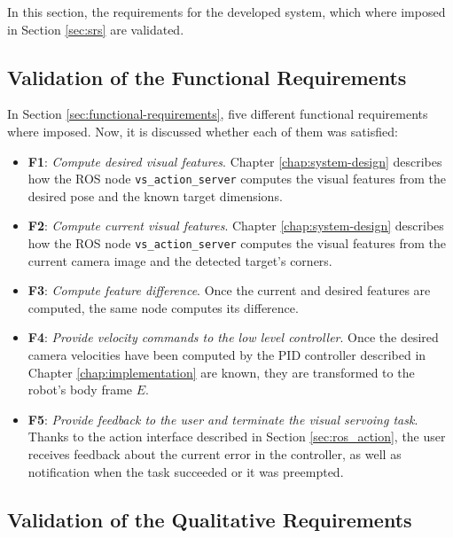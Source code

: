 In this section, the requirements for the developed system, which where imposed in Section \ref{sec:srs} are validated.

\subsection{Validation of the Functional Requirements}
\label{sec:functional-requirements-validation}

In Section \ref{sec:functional-requirements}, five different functional requirements where imposed. Now, it is discussed whether each of them was satisfied:

\begin{itemize}
	\item \textbf{F1}: \emph{Compute desired visual features}. Chapter \ref{chap:system-design} describes how the ROS node \texttt{vs\_action\_server} computes the visual features from the desired pose and the known target dimensions.
	
	\item \textbf{F2}: \emph{Compute current visual features}. Chapter \ref{chap:system-design} describes how the ROS node \texttt{vs\_action\_server} computes the visual features from the current camera image and the detected target's corners.
	
	\item \textbf{F3}: \emph{Compute feature difference}. Once the current and desired features are computed, the same node computes its difference.
	
	\item \textbf{F4}: \emph{Provide velocity commands to the low level controller}. Once the desired camera velocities have been computed by the PID controller described in Chapter \ref{chap:implementation} are known, they are transformed to the robot's body frame $E$.
	
	\item \textbf{F5}: \emph{Provide feedback to the user and terminate the visual servoing task}. Thanks to the action interface described in Section \ref{sec:ros_action}, the user receives feedback about the current error in the controller, as well as notification when the task succeeded or it was preempted.
\end{itemize}

\subsection{Validation of the Qualitative Requirements}
\label{sec:sec:other-requirements-validation}

